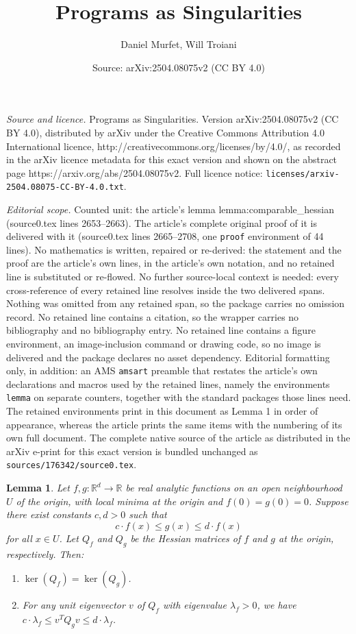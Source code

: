 \documentclass[10pt,a4paper]{amsart}
\title{Programs as Singularities}
\author{Daniel Murfet, Will Troiani}
\date{Source: arXiv:2504.08075v2 (CC BY 4.0)}
\newtheorem{lemma}{Lemma}
\begin{document}
\maketitle

\noindent\emph{Source and licence.} Programs as Singularities. Version arXiv:2504.08075v2 (CC BY 4.0), distributed by arXiv under the Creative Commons Attribution 4.0 International licence, http://creativecommons.org/licenses/by/4.0/, as recorded in the arXiv licence metadata for this exact version and shown on the abstract page https://arxiv.org/abs/2504.08075v2. Full licence notice: \texttt{licenses/arxiv-2504.08075-CC-BY-4.0.txt}.\par\smallskip

\noindent\textit{Editorial scope.} Counted unit: the article's lemma lemma:comparable\_hessian (source0.tex lines 2653--2663). The article's complete original proof of it is delivered with it (source0.tex lines 2665--2708, one \texttt{proof} environment of 44 lines). No mathematics is written, repaired or re-derived: the statement and the proof are the article's own lines, in the article's own notation, and no retained line is substituted or re-flowed.  No further source-local context is needed: every cross-reference of every retained line resolves inside the two delivered spans.  Nothing was omitted from any retained span, so the package carries no omission record.  No retained line contains a citation, so the wrapper carries no bibliography and no bibliography entry.  No retained line contains a figure environment, an image-inclusion command or drawing code, so no image is delivered and the package declares no asset dependency.  Editorial formatting only, in addition: an AMS \texttt{amsart} preamble that restates the article's own declarations and macros used by the retained lines, namely the environments \texttt{lemma} on separate counters, together with the standard packages those lines need.  The retained environments print in this document as Lemma 1 in order of appearance, whereas the article prints the same items with the numbering of its own full document.  The complete native source of the article as distributed in the arXiv e-print for this exact version is bundled unchanged as \texttt{sources/176342/source0.tex}.
\begin{lemma}\label{lemma:comparable_hessian}
Let $f, g: \mathbb{R}^d \to \mathbb{R}$ be real analytic functions on an open neighbourhood $U$ of the origin, with local minima at the origin and $f(0) = g(0) = 0$. Suppose there exist constants $c, d > 0$ such that 
\begin{equation}
c \cdot f(x) \leq g(x) \leq d \cdot f(x)
\end{equation}
for all $x \in U$. Let $Q_f$ and $Q_g$ be the Hessian matrices of $f$ and $g$ at the origin, respectively. Then:
\begin{enumerate}
\item[(i)] $\ker(Q_f) = \ker(Q_g)$.
\item[(ii)] For any unit eigenvector $v$ of $Q_f$ with eigenvalue $\lambda_f > 0$, we have $c \cdot \lambda_f \leq v^T Q_g v \leq d \cdot \lambda_f$.
\end{enumerate}
\end{lemma}
\end{document}
